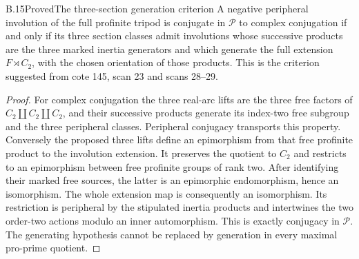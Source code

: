 \begin{statement}{B.15}{Proved}{The three-section generation criterion}
A negative peripheral involution of the full profinite tripod is
conjugate in $\mathcal P$ to complex conjugation if and only if
its three section classes admit involutions whose successive
products are the three marked inertia generators and which
generate the full extension $F\rtimes C_2$, with the chosen
orientation of those products. This is the criterion suggested
from cote 145, scan 23 and scans 28--29.
\end{statement}
\begin{proof}
For complex conjugation the three real-arc lifts are the three
free factors of $C_2\amalg C_2\amalg C_2$, and their successive
products generate its index-two free subgroup and the three
peripheral classes. Peripheral conjugacy transports this property.
Conversely the proposed three lifts define an epimorphism from
that free profinite product to the involution extension. It
preserves the quotient to $C_2$ and restricts to an epimorphism
between free profinite groups of rank two. After identifying their
marked free sources, the latter is an epimorphic endomorphism,
hence an isomorphism. The whole extension map is consequently an
isomorphism. Its restriction is peripheral by the stipulated
inertia products and intertwines the two order-two actions modulo
an inner automorphism. This is exactly conjugacy in $\mathcal P$.
The generating hypothesis cannot be replaced by generation in
every maximal pro-prime quotient.
\end{proof}

